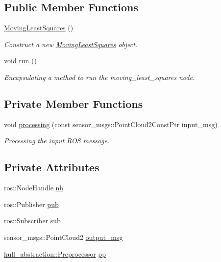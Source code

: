 \subsection*{Public Member Functions}
\begin{DoxyCompactItemize}
\item 
\hyperlink{classmoving__least__squares__node_1_1_moving_least_squares_a55eba7b489543e53e018651e1039e51a}{Moving\+Least\+Squares} ()
\begin{DoxyCompactList}\small\item\em Construct a new \hyperlink{classmoving__least__squares__node_1_1_moving_least_squares}{Moving\+Least\+Squares} object. \end{DoxyCompactList}\item 
void \hyperlink{classmoving__least__squares__node_1_1_moving_least_squares_afb03a339aa9ae129d42af0b7d49dfb2c}{run} ()
\begin{DoxyCompactList}\small\item\em Encapsulating a method to run the moving\+\_\+least\+\_\+squares node. \end{DoxyCompactList}\end{DoxyCompactItemize}
\subsection*{Private Member Functions}
\begin{DoxyCompactItemize}
\item 
void \hyperlink{classmoving__least__squares__node_1_1_moving_least_squares_ab334356e26407324a4fb15ab3dbf9daa}{processing} (const sensor\+\_\+msgs\+::\+Point\+Cloud2\+Const\+Ptr input\+\_\+msg)
\begin{DoxyCompactList}\small\item\em Processing the input R\+OS message. \end{DoxyCompactList}\end{DoxyCompactItemize}
\subsection*{Private Attributes}
\begin{DoxyCompactItemize}
\item 
ros\+::\+Node\+Handle \hyperlink{classmoving__least__squares__node_1_1_moving_least_squares_ae4c2a5c0960cec2bc990d0f19fee3ecb}{nh}
\item 
ros\+::\+Publisher \hyperlink{classmoving__least__squares__node_1_1_moving_least_squares_a575c8db3fd78dc6e4bfd432d2d75916c}{pub}
\item 
ros\+::\+Subscriber \hyperlink{classmoving__least__squares__node_1_1_moving_least_squares_a3afb046b92a8d8df03d06542ba9fc9bd}{sub}
\item 
sensor\+\_\+msgs\+::\+Point\+Cloud2 \hyperlink{classmoving__least__squares__node_1_1_moving_least_squares_af6fbf84b91043961cc80fb71505992dd}{output\+\_\+msg}
\item 
\hyperlink{classhull__abstraction_1_1_preprocessor}{hull\+\_\+abstraction\+::\+Preprocessor} \hyperlink{classmoving__least__squares__node_1_1_moving_least_squares_a64551d7faad6e219620e142472edbada}{pp}
\end{DoxyCompactItemize}


